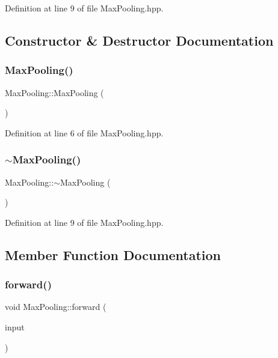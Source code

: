 Definition at line 9 of file Max\+Pooling.\+hpp.



\subsection{Constructor \& Destructor Documentation}
\mbox{\label{class_max_pooling_a30af265648a9a66ab4e6fd323a9b4027}} 
\subsubsection{\texorpdfstring{Max\+Pooling()}{MaxPooling()}}
{\footnotesize\ttfamily Max\+Pooling\+::\+Max\+Pooling (\begin{DoxyParamCaption}{ }\end{DoxyParamCaption})}



Definition at line 6 of file Max\+Pooling.\+hpp.

\mbox{\label{class_max_pooling_aa2597b9c0c1ec6ca99053da08df5f628}} 
\subsubsection{\texorpdfstring{$\sim$\+Max\+Pooling()}{~MaxPooling()}}
{\footnotesize\ttfamily Max\+Pooling\+::$\sim$\+Max\+Pooling (\begin{DoxyParamCaption}{ }\end{DoxyParamCaption})}



Definition at line 9 of file Max\+Pooling.\+hpp.



\subsection{Member Function Documentation}
\mbox{\label{class_max_pooling_ae8556d4b6e3b583d02386b9b71b53a80}} 
\subsubsection{\texorpdfstring{forward()}{forward()}}
{\footnotesize\ttfamily void Max\+Pooling\+::forward (\begin{DoxyParamCaption}\item[{std\+::vector$<$ Eigen\+::\+Matrix\+Xd $>$}]{input }\end{DoxyParamCaption})\hspace{0.3cm}{\ttfamily [virtual]}}



